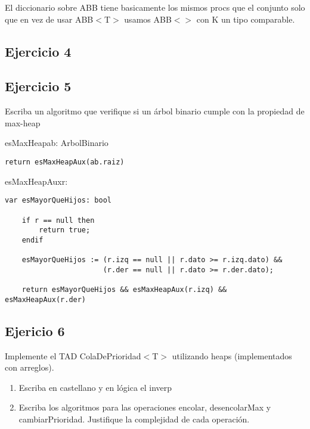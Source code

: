 El diccionario sobre ABB tiene basicamente los mismos procs que el conjunto solo que en vez de usar ABB$<$T$>$ usamos ABB$<$$>$ con K un tipo comparable.

\subsection{Ejercicio 4}
\hacer

\subsection{Ejercicio 5}
Escriba un algoritmo que verifique si un árbol binario cumple con la propiedad de max-heap

\begin{proc}{esMaxHeap}{\In ab: ArbolBinario}{\bool}
	\begin{lstlisting}[numbers=none,frame=none]
	return esMaxHeapAux(ab.raiz)
	\end{lstlisting}
\end{proc}

\begin{proc}{esMaxHeapAux}{\In r: \nodo}{\bool}
	\begin{lstlisting}[numbers=none,frame=none]
	var esMayorQueHijos: bool

	if r == null then
		return true;
	endif

	esMayorQueHijos := (r.izq == null || r.dato >= r.izq.dato) &&
					   (r.der == null || r.dato >= r.der.dato);

	return esMayorQueHijos && esMaxHeapAux(r.izq) && esMaxHeapAux(r.der)
	\end{lstlisting}
\end{proc}

\subsection{Ejericio 6}
Implemente el TAD ColaDePrioridad$<$T$>$ utilizando heaps (implementados con arreglos).
\begin{enumerate}
	\item Escriba en castellano y en lógica el inverp
	\item Escriba los algoritmos para las operaciones encolar, desencolarMax y cambiarPrioridad. Justifique la complejidad de cada operación.
\end{enumerate}

